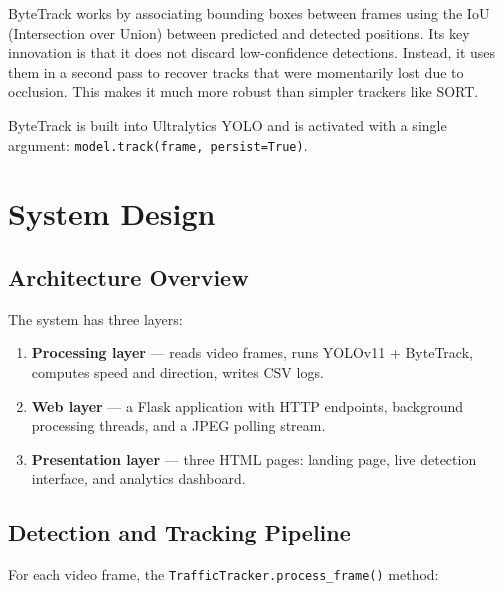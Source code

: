 \documentclass[12pt,a4paper,leqno]{report}
\begin{document}
ByteTrack \cite{zhang2022bytetrack} works by associating bounding boxes between frames using the IoU (Intersection over Union) between predicted and detected positions. Its key innovation is that it does not discard low-confidence detections. Instead, it uses them in a second pass to recover tracks that were momentarily lost due to occlusion. This makes it much more robust than simpler trackers like SORT.

ByteTrack is built into Ultralytics YOLO and is activated with a single argument: \texttt{model.track(frame, persist=True)}.

\chapter{System Design}

\section{Architecture Overview}

The system has three layers:

\begin{enumerate}[label=\arabic*.]
  \item \textbf{Processing layer} — reads video frames, runs YOLOv11 + ByteTrack, computes speed and direction, writes CSV logs.
  \item \textbf{Web layer} — a Flask application with HTTP endpoints, background processing threads, and a JPEG polling stream.
  \item \textbf{Presentation layer} — three HTML pages: landing page, live detection interface, and analytics dashboard.
\end{enumerate}

\section{Detection and Tracking Pipeline}

For each video frame, the \texttt{TrafficTracker.process\_frame()} method:
\end{document}
